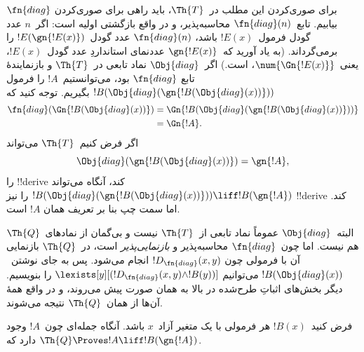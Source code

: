 \documentclass[../../../include/open-logic-section]{subfiles}
\begin{document}
\begin{explain}
برای صوری‌کردن این مطلب در~$\Th{T}$، باید راهی برای صوری‌کردن
$\fn{diag}$ بیابیم. تابع~$\fn{diag}(n)$ محاسبه‌پذیر، و در واقع بازگشتی
اولیه است: اگر~$n$ عدد گودل فرمول~$!E(x)$ باشد، $\fn{diag}(n)$ عدد
گودل~$!E(\gn{!E(x)})$ را برمی‌گرداند. (به یاد آورید که~$\gn{!E(x)}$
عددنمای استانداردِ عدد گودل~$!E(x)$، یعنی~$\num{\Gn{!E(x)}}$، است.)
اگر~$\Obj{diag}$ نماد تابعی در~$\Th{T}$ و بازنمایندهٔ تابع
$\fn{diag}$ بود، می‌توانستیم~$!A$ را فرمول
$!B(\Obj{diag}(\gn{!B(\Obj{diag}(x))}))$ بگیریم. توجه کنید که
\begin{align*}
\fn{diag}(\Gn{!B(\Obj{diag}(x))}) & =
\Gn{!B(\Obj{diag}(\gn{!B(\Obj{diag}(x))}))} \\
& = \Gn{!A}.
\end{align*}
اگر فرض کنیم~$\Th{T}$ می‌تواند
\[
\Obj{diag}(\gn{!B(\Obj{diag}(x))}) = \gn{!A},
\]
را !!{derive} کند، آنگاه می‌تواند
$!B(\Obj{diag}(\gn{!B(\Obj{diag}(x))}))
\liff !B(\gn{!A})$ را نیز !!{derive} کند. اما سمت چپ بنا بر تعریف همان
$!A$ است.

البته~$\Obj{diag}$ عموماً نماد تابعی از~$\Th{T}$ نیست و بی‌گمان از
نمادهای~$\Th{Q}$ هم نیست. اما چون~$\fn{diag}$ محاسبه‌پذیر و
\emph{بازنمایی‌پذیر} است، در~$\Th{Q}$ بازنمایی آن با فرمولی چون
$!D_{\fn{diag}}(x,y)$ انجام می‌شود.
پس به جای نوشتن~$!B(\Obj{diag}(x))$ می‌توانیم
$\lexists[y][(!D_{\fn{diag}}(x,y) \land !B(y))]$ را بنویسیم. دیگر
بخش‌های اثباتِ طرح‌شده در بالا به همان صورت پیش می‌روند، و در واقع
همهٔ آن‌ها از همان~$\Th{Q}$ نتیجه می‌شوند.
\end{explain}

\begin{lem}
 فرض کنید~$!B(x)$ هر فرمولی با یک متغیر
آزاد~$x$ باشد. آنگاه جمله‌ای چون~$!A$ وجود دارد که
$\Th{Q} \Proves !A \liff !B(\gn{!A})$.
\end{lem}
\end{document}
